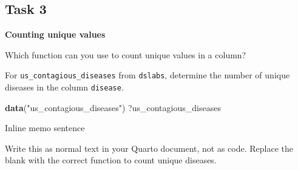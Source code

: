 \documentclass[
]{article}
\newenvironment{Shaded}{\begin{snugshade}}{\end{snugshade}}
\newcommand{\AttributeTok}[1]{\textcolor[rgb]{0.13,0.29,0.53}{#1}}
\newcommand{\CommentTok}[1]{\textcolor[rgb]{0.56,0.35,0.01}{\textit{#1}}}
\newcommand{\DocumentationTok}[1]{\textcolor[rgb]{0.56,0.35,0.01}{\textbf{\textit{#1}}}}
\newcommand{\FunctionTok}[1]{\textcolor[rgb]{0.13,0.29,0.53}{\textbf{#1}}}
\newcommand{\NormalTok}[1]{#1}
\newcommand{\SpecialCharTok}[1]{\textcolor[rgb]{0.81,0.36,0.00}{\textbf{#1}}}
\newcommand{\StringTok}[1]{\textcolor[rgb]{0.31,0.60,0.02}{#1}}
\begin{document}
\subsection{Task 3}\label{task-3}

\textbf{Counting unique values}

Which function can you use to count unique values in a column?

For \texttt{us\_contagious\_diseases} from \texttt{dslabs}, determine
the number of unique diseases in the column \texttt{disease}.

\begin{Shaded}
\begin{Highlighting}[]
\FunctionTok{data}\NormalTok{(}\StringTok{"us\_contagious\_diseases"}\NormalTok{)}
\NormalTok{?us\_contagious\_diseases}
\end{Highlighting}
\end{Shaded}

\begin{Shaded}
\end{Shaded}

Inline memo sentence

Write this as normal text in your Quarto document, not as code. Replace
the blank with the correct function to count unique diseases.

\begin{Shaded}
\end{Shaded}
\end{document}
